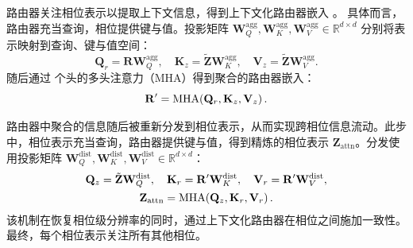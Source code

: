 路由器关注相位表示以提取上下文信息，得到上下文化路由器嵌入
。
具体而言，路由器充当查询，相位提供键与值。投影矩阵
$\mathbf{W}_Q^{\text{agg}},\mathbf{W}_K^{\text{agg}},\mathbf{W}_V^{\text{agg}}\in\mathbb{R}^{d\times d}$
分别将表示映射到查询、键与值空间：
\begin{equation}
\mathbf{Q}_r=\mathbf{R}\mathbf{W}_Q^{\text{agg}},\quad
\mathbf{K}_z=\tilde{\mathbf{Z}}\mathbf{W}_K^{\text{agg}},\quad
\mathbf{V}_z=\tilde{\mathbf{Z}}\mathbf{W}_V^{\text{agg}}.
\end{equation}
随后通过  个头的多头注意力（MHA）得到聚合的路由器嵌入：
\begin{equation}
\mathbf{R}'=\mathrm{MHA}\!\left(\mathbf{Q}_r,\mathbf{K}_z,\mathbf{V}_z\right).
\end{equation}

路由器中聚合的信息随后被重新分发到相位表示，从而实现跨相位信息流动。此步中，相位表示充当查询，路由器提供键与值，得到精炼的相位表示 $\mathbf{Z}_{\text{attn}}$。分发使用投影矩阵 $\mathbf{W}_Q^{\text{dist}}, \mathbf{W}_K^{\text{dist}}, \mathbf{W}_V^{\text{dist}}\in\mathbb{R}^{d\times d}$：
\begin{equation}
\begin{gathered}
\mathbf{Q}_z=\tilde{\mathbf{Z}}\mathbf{W}_Q^{\text{dist}},\quad
\mathbf{K}_r=\mathbf{R}'\mathbf{W}_K^{\text{dist}},\quad
\mathbf{V}_r=\mathbf{R}'\mathbf{W}_V^{\text{dist}},\\
\mathbf{Z}_{\text{attn}}=\mathrm{MHA}\!\left(\mathbf{Q}_z,\mathbf{K}_r,\mathbf{V}_r\right).
\end{gathered}
\end{equation}
该机制在恢复相位级分辨率的同时，通过上下文化路由器在相位之间施加一致性。
最终，每个相位表示关注所有其他相位。


